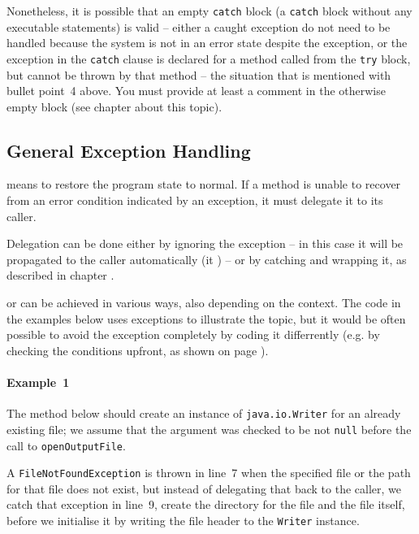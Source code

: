 Nonetheless, it is possible that an empty \lstinline|catch| block (a \lstinline|catch| block without any executable statements) is valid – either a caught exception do not need to be handled because the system is not in an error state despite the exception, or the exception in the \lstinline|catch| clause is declared for a method called from the \lstinline|try| block, but cannot be thrown by that method – the situation that is mentioned with bullet point~4 above. You must provide at least a comment in the otherwise empty block (see  chapter  about this topic).
 

\subsection{General Exception Handling}\label{sec:GeneralExceptionHandling}

 means to restore the program state to normal. If a method is unable to recover from an error condition indicated by an exception, it must delegate it to its caller.

Delegation can be done either by ignoring the exception – in this case it will be propagated to the caller automatically (it ) – or by catching and wrapping it, as described in chapter .

 or  can be achieved in various ways, also depending on the context. The code in the examples below uses exceptions to illustrate the topic, but it would be often possible to avoid the exception completely by coding it differrently (e.g. by checking the conditions upfront, as shown on page \pageref{lbl:ValidateInput}).

\paragraph{Example~1} The method below should create an instance of \lstinline|java.io.Writer| for an already existing file; we assume that the argument was checked to be not \lstinline|null| before the call to \lstinline|openOutputFile|.

A \lstinline|FileNotFoundException| is thrown in line~7 when the specified file or the path for that file does not exist, but instead of delegating that back to the caller, we catch that exception in line~9, create the directory for the file and the file itself, before we initialise it by writing the file header to the \lstinline|Writer| instance. 

